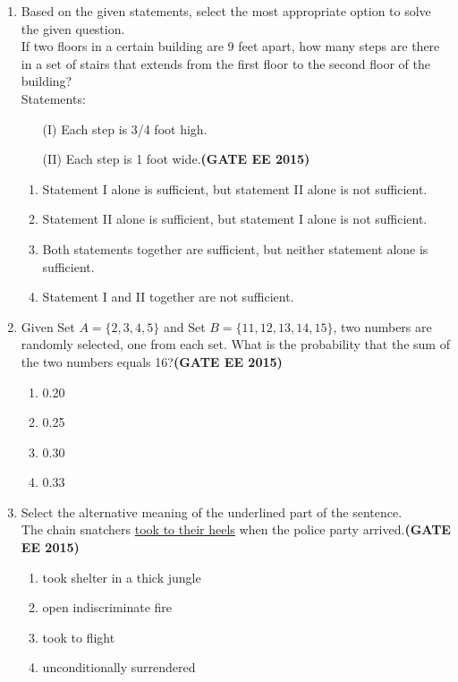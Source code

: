 \documentclass[a4paper,12pt]{exam}
\theoremstyle{remark}
\begin{document}
\begin{enumerate}
\item Based on the given statements, select the most appropriate option to solve the given question.\\
If two floors in a certain building are 9 feet apart, how many steps are there in a set of stairs that extends from the first floor to the second floor of the building?\\
Statements:
\begin{enumerate} 
\item[(I)] Each step is 3/4 foot high.
\item[(II)] Each step is 1 foot wide.\hfill{\textbf{(GATE EE 2015)}}
\end{enumerate}
  
    \begin{enumerate}   
        \item Statement I alone is sufficient, but statement II alone is not sufficient.
        \item Statement II alone is sufficient, but statement I alone is not sufficient.
        \item Both statements together are sufficient, but neither statement alone is sufficient.
        \item Statement I and II together are not sufficient.
    \end{enumerate}
  \newpage

\item Given Set $A = \{2, 3, 4, 5\}$ and Set $B = \{11, 12, 13, 14, 15\}$, two numbers are randomly selected, one from each set. What is the probability that the sum of the two numbers equals 16?\hfill{\textbf{(GATE EE 2015)}}
    \begin{multicols}{4}
    \begin{enumerate}   
        \item 0.20
        \item 0.25
        \item 0.30
        \item 0.33
    \end{enumerate}
    \end{multicols}
\item Select the alternative meaning of the underlined part of the sentence.\\
The chain snatchers \underline{took to their heels} when the police party arrived.\hfill{\textbf{(GATE EE 2015)}}
    \begin{multicols}{4}
    \begin{enumerate}
        \item took shelter in a thick jungle
        \item open indiscriminate fire
        \item took to flight
        \item unconditionally surrendered
    \end{enumerate}
    \end{multicols}


\end{enumerate}
\end{document}
